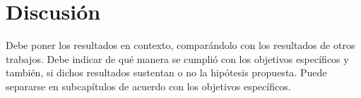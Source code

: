 \setcounter{figure}{0} %
\renewcommand{\thefigure}{\thesection.\arabic{figure}}
\chapter{Discusión}
Debe poner los resultados en contexto, comparándolo con los resultados de otros trabajos. Debe indicar de qué manera se cumplió con los objetivos específicos y también, si dichos resultados sustentan o no la hipótesis propuesta. Puede separarse en subcapítulos de acuerdo con los objetivos específicos.
